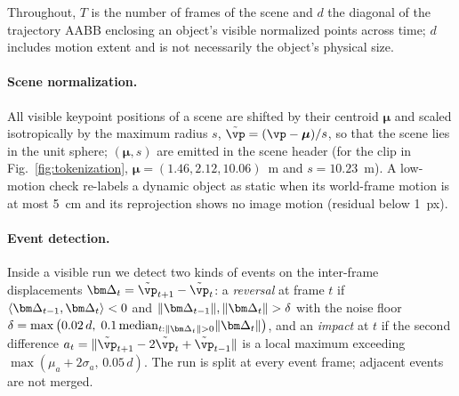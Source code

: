 Throughout, $T$ is the number of frames of the scene and $d$ the diagonal of the trajectory AABB enclosing an object's visible normalized points across time; $d$ includes motion extent and is not necessarily the object's physical size.

\paragraph{Scene normalization.}
All visible keypoint positions of a scene are shifted by their centroid $\boldsymbol{\mu}$ and scaled isotropically by the maximum radius $s$, $\tilde{\vp}=(\vp-\boldsymbol{\mu})/s$, so that the scene lies in the unit sphere; $(\boldsymbol{\mu},s)$ are emitted in the scene header (for the clip in Fig.~\ref{fig:tokenization}, $\boldsymbol{\mu}=(1.46,2.12,10.06)$~m and $s=10.23$~m).
A low-motion check re-labels a dynamic object as static when its world-frame motion is at most 5~cm and its reprojection shows no image motion (residual below 1~px).

\paragraph{Event detection.}
Inside a visible run we detect two kinds of events on the inter-frame displacements $\vDelta_t=\tilde{\vp}_{t+1}-\tilde{\vp}_t$: a \emph{reversal} at frame $t$ if
$\langle\vDelta_{t-1},\vDelta_t\rangle<0$ and $\|\vDelta_{t-1}\|,\|\vDelta_t\|>\delta$ with the noise floor $\delta=\max\big(0.02\,d,\;0.1\,\mathrm{median}_{t:\|\vDelta_t\|>0}\|\vDelta_t\|\big)$, and an \emph{impact} at $t$ if the second difference $a_t=\|\tilde{\vp}_{t+1}-2\tilde{\vp}_t+\tilde{\vp}_{t-1}\|$ is a local maximum exceeding $\max(\mu_a+2\sigma_a,\,0.05\,d)$.
The run is split at every event frame; adjacent events are not merged.

